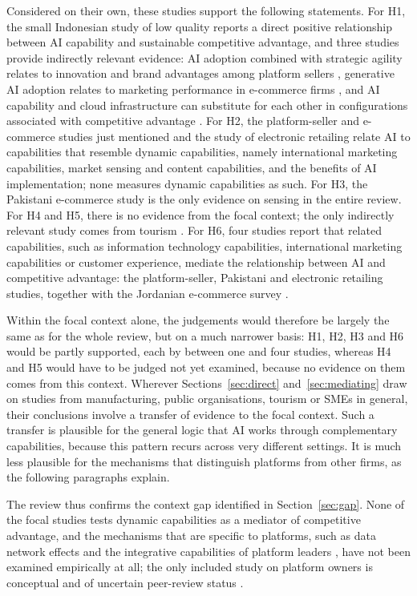 Considered on their own, these studies support the following statements. For H1, the small Indonesian study of low quality reports a direct positive relationship between AI capability and sustainable competitive advantage, and three studies provide indirectly relevant evidence: AI adoption combined with strategic agility relates to innovation and brand advantages among platform sellers \parencite{guo2025}, generative AI adoption relates to marketing performance in e-commerce firms \parencite{noor2026}, and AI capability and cloud infrastructure can substitute for each other in configurations associated with competitive advantage \parencite{adamu2026}. For H2, the platform-seller and e-commerce studies just mentioned and the study of electronic retailing \parencite{bunea2026} relate AI to capabilities that resemble dynamic capabilities, namely international marketing capabilities, market sensing and content capabilities, and the benefits of AI implementation; none measures dynamic capabilities as such. For H3, the Pakistani e-commerce study is the only evidence on sensing in the entire review. For H4 and H5, there is no evidence from the focal context; the only indirectly relevant study comes from tourism \parencite{li2026}. For H6, four studies report that related capabilities, such as information technology capabilities, international marketing capabilities or customer experience, mediate the relationship between AI and competitive advantage: the platform-seller, Pakistani and electronic retailing studies, together with the Jordanian e-commerce survey \parencite{awamleh2022}.

Within the focal context alone, the judgements would therefore be largely the same as for the whole review, but on a much narrower basis: H1, H2, H3 and H6 would be partly supported, each by between one and four studies, whereas H4 and H5 would have to be judged not yet examined, because no evidence on them comes from this context. Wherever Sections~\ref{sec:direct} and~\ref{sec:mediating} draw on studies from manufacturing, public organisations, tourism or SMEs in general, their conclusions involve a transfer of evidence to the focal context. Such a transfer is plausible for the general logic that AI works through complementary capabilities, because this pattern recurs across very different settings. It is much less plausible for the mechanisms that distinguish platforms from other firms, as the following paragraphs explain.

The review thus confirms the context gap identified in Section~\ref{sec:gap}. None of the focal studies tests dynamic capabilities as a mediator of competitive advantage, and the mechanisms that are specific to platforms, such as data network effects \parencite{gregory2021} and the integrative capabilities of platform leaders \parencite{helfat2018}, have not been examined empirically at all; the only included study on platform owners is conceptual and of uncertain peer-review status \parencite{dzreke2025b}.


